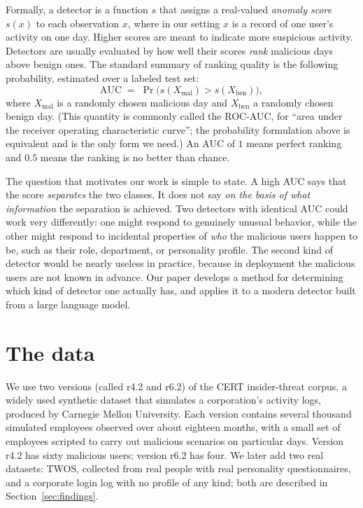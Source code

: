 \documentclass[10pt]{article}
\begin{document}
Formally, a detector is a function $s$ that assigns a real-valued
\emph{anomaly score} $s(x)$ to each observation $x$, where in our setting
$x$ is a record of one user's activity on one day. Higher scores are
meant to indicate more suspicious activity. Detectors are usually
evaluated by how well their scores \emph{rank} malicious days above
benign ones. The standard summary of ranking quality is the following
probability, estimated over a labeled test set:
\begin{equation}
\mathrm{AUC} \;=\; \Pr\bigl( s(X_{\mathrm{mal}}) > s(X_{\mathrm{ben}})
\bigr),
\end{equation}
where $X_{\mathrm{mal}}$ is a randomly chosen malicious day and
$X_{\mathrm{ben}}$ a randomly chosen benign day. (This quantity is
commonly called the ROC-AUC, for ``area under the receiver operating
characteristic curve''; the probability formulation above is equivalent
and is the only form we need.) An AUC of $1$ means perfect ranking and
$0.5$ means the ranking is no better than chance.

The question that motivates our work is simple to state. A high AUC says
that the score \emph{separates} the two classes. It does not say
\emph{on the basis of what information} the separation is achieved. Two
detectors with identical AUC could work very differently: one might
respond to genuinely unusual behavior, while the other might respond to
incidental properties of \emph{who} the malicious users happen to be,
such as their role, department, or personality profile. The second kind
of detector would be nearly useless in practice, because in deployment
the malicious users are not known in advance. Our paper develops a
method for determining which kind of detector one actually has, and
applies it to a modern detector built from a large language model.

\section{The data}

We use two versions (called r4.2 and r6.2) of the CERT insider-threat
corpus, a widely used synthetic dataset that simulates a corporation's
activity logs, produced by Carnegie Mellon University. Each version
contains several thousand simulated employees observed over about
eighteen months, with a small set of employees scripted to carry out
malicious scenarios on particular days. Version r4.2 has sixty malicious
users; version r6.2 has four. We later add two real datasets: TWOS, collected from real people with
real personality questionnaires, and a corporate login log with no profile
of any kind; both are described in Section~\ref{sec:findings}.
\end{document}
